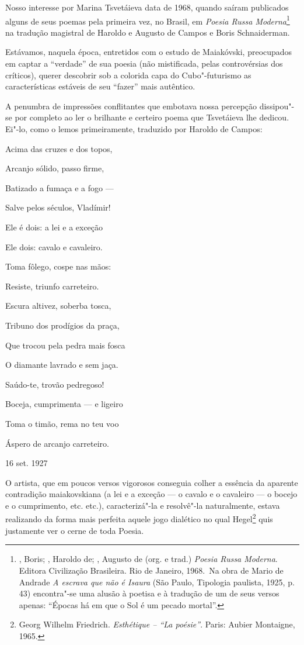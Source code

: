 Nosso interesse por Marina Tsvetáieva data de 1968, quando saíram
publicados alguns de seus poemas pela primeira vez, no Brasil, em
\emph{Poesia Russa Moderna}\footnote{, Boris; ,
  Haroldo de; , Augusto de (org. e trad.) \emph{Poesia Russa Moderna}.
  Editora Civilização Brasileira. Rio de Janeiro, 1968.~Na obra de Mario
  de Andrade \emph{A escrava que não é Isaura} (São Paulo, Tipologia
  paulista, 1925, p. 43) encontra"-se uma alusão à poetisa e à tradução
  de um de seus versos apenas: ``Épocas há em que o Sol é um pecado
  mortal''.} na tradução magistral de Haroldo e Augusto de Campos e
Boris Schnaiderman.

Estávamos, naquela época, entretidos com o estudo de Maiakóvski,
preocupados em captar a ``verdade'' de sua poesia (não mistificada,
pelas controvérsias dos críticos), querer descobrir sob a colorida capa
do Cubo"-futurismo as características estáveis de seu ``fazer'' mais
autêntico.

A penumbra de impressões conflitantes que embotava nossa percepção
dissipou"-se por completo ao ler o brilhante e certeiro poema que
Tsvetáieva lhe dedicou. Ei"-lo, como o lemos primeiramente, traduzido por
Haroldo de Campos:

Acima das cruzes e dos topos,

Arcanjo sólido, passo firme,

Batizado a fumaça e a fogo ---

Salve pelos séculos, Vladímir!

Ele é dois: a lei e a exceção

Ele dois: cavalo e cavaleiro.

Toma fôlego, cospe nas mãos:

Resiste, triunfo carreteiro.

Escura altivez, soberba tosca,

Tribuno dos prodígios da praça,

Que trocou pela pedra mais fosca

O diamante lavrado e sem jaça.

Saúdo-te, trovão pedregoso!

Boceja, cumprimenta --- e ligeiro

Toma o timão, rema no teu voo

Áspero de arcanjo carreteiro.

16 set. 1927

O artista, que em poucos versos vigorosos conseguia colher a essência da
aparente contradição maiakovskiana (a lei e a exceção --- o cavalo e o
cavaleiro --- o bocejo e o cumprimento, etc. etc.), caracterizá"-la e
resolvê"-la naturalmente, estava realizando da forma mais perfeita aquele
jogo dialético no qual Hegel\footnote{ Georg Wilhelm
  Friedrich. \emph{Esthétique -- ``La poésie''}. Paris: Aubier
  Montaigne, 1965.} quis justamente ver o cerne de toda Poesia.

